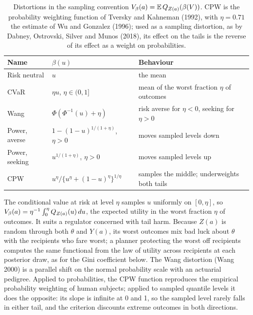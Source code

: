 \begin{table}[htbp]
\centering\small
\begin{tabular}{@{}L{0.95in}L{1.45in}L{1.75in}@{}}
\toprule
Name & $\beta(u)$ & Behaviour \\
\midrule
Risk neutral & $u$ & the mean \\
CVaR & $\eta u$, $\eta\in(0,1]$ & mean of the worst fraction $\eta$ of outcomes \\
Wang & $\Phi(\Phi^{-1}(u)+\eta)$ & risk averse for $\eta<0$, seeking for $\eta>0$ \\
Power, averse & $1-(1-u)^{1/(1+\eta)}$, $\eta>0$ & moves sampled levels down \\
Power, seeking & $u^{1/(1+\eta)}$, $\eta>0$ & moves sampled levels up \\
CPW & $u^\eta/\{u^\eta+(1-u)^\eta\}^{1/\eta}$ & samples the middle; underweights both tails \\
\bottomrule
\end{tabular}
\caption{Distortions in the sampling convention $\Vbeta(a) = \E\,\Qz(\beta(V))$. CPW is the probability weighting function of Tversky and Kahneman (1992), with $\eta = 0.71$ the estimate of Wu and Gonzalez (1996); used as a sampling distortion, as by Dabney, Ostrovski, Silver and Munos (2018), its effect on the tails is the reverse of its effect as a weight on probabilities.}
\label{gbc:tab:distortions}
\end{table}

The conditional value at risk at level $\eta$ samples $u$ uniformly on $[0,\eta]$, so $V_\beta(a) = \eta^{-1}\int_0^\eta Q_{Z(a)}(u)\,du$, the expected utility in the worst fraction $\eta$ of outcomes. It suits a regulator concerned with tail harm. Because $Z(a)$ is random through both $\theta$ and $Y(a)$, its worst outcomes mix bad luck about $\theta$ with the recipients who fare worst; a planner protecting the worst off recipients computes the same functional from the law of utility across recipients at each posterior draw, as for the Gini coefficient below. The Wang distortion (Wang 2000) is a parallel shift on the normal probability scale with an actuarial pedigree. Applied to probabilities, the CPW function reproduces the empirical probability weighting of human subjects; applied to sampled quantile levels it does the opposite: its slope is infinite at 0 and 1, so the sampled level rarely falls in either tail, and the criterion discounts extreme outcomes in both directions.

